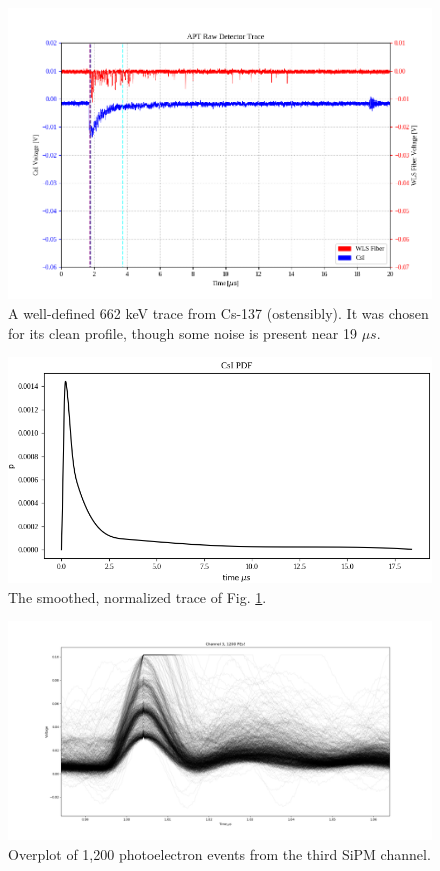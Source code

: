 \documentclass[11pt]{article}
\begin{document}
	
	\begin{figure}
		\centering
		\includegraphics[width=1.0\linewidth]{CsI_trace}
		\caption{A well-defined 662 keV trace from Cs-137 (ostensibly). It was chosen for its clean profile, though some noise is present near 19 $\mu s$.}
		\label{fig:CsI_trace}
	\end{figure}

	\begin{figure}
		\centering
		\includegraphics[width=1.0\linewidth]{CsI_PDF}
		\caption{The smoothed, normalized trace of Fig. \ref{fig:CsI_trace}.}
		\label{fig:CsI_PDF}
	\end{figure}

	\begin{figure}
		\centering
		\includegraphics[width=1.2\linewidth]{1200_channel3_PEs}
		\caption{Overplot of 1,200 photoelectron events from the third SiPM channel.}
		\label{fig:PE_traces}
	\end{figure}
\end{document}
